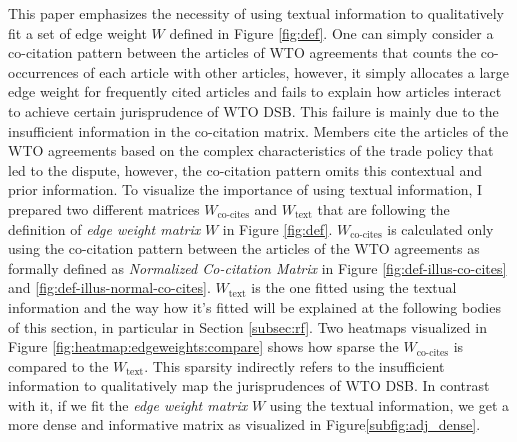 This paper emphasizes the necessity of using textual information
to qualitatively fit a set of edge weight $W$ defined in Figure \ref{fig:def}. %
One can simply consider a co-citation pattern between the articles of WTO agreements that counts the co-occurrences of each article with other articles, however,
it simply allocates a large edge weight for frequently cited articles and fails to explain how articles interact to achieve certain jurisprudence of WTO DSB. %
This failure is mainly due to the insufficient information in the co-citation matrix. Members cite the articles of
the WTO agreements based on the complex characteristics of
the trade policy that led to the dispute, however, the co-citation pattern omits this contextual and prior information. To visualize the importance of using textual information, I prepared two different matrices $W_{\text{co-cites}}$ and $W_{\text{text}}$ that are following the definition of \textit{edge weight matrix} $W$ in Figure \ref{fig:def}.
$W_{\text{co-cites}}$ is calculated only using the co-citation pattern between the articles of the WTO agreements as formally defined as \textit{Normalized Co-citation Matrix} in Figure \ref{fig:def-illus-co-cites} and \ref{fig:def-illus-normal-co-cites}.
$W_{\text{text}}$ is the one fitted using the textual information and the way how it's fitted will be explained at the following bodies of this section, in particular in Section \ref{subsec:rf}.
Two heatmaps visualized in Figure \ref{fig:heatmap:edgeweights:compare} shows how sparse the $W_{\text{co-cites}}$ is compared to the $W_{\text{text}}$. This sparsity indirectly refers to the insufficient information
to qualitatively map the jurisprudences of WTO DSB.
In contrast with it, if we fit the \textit{edge weight matrix} $W$ using the textual information, we get a more dense and informative matrix as visualized in Figure\ref{subfig:adj_dense}.
